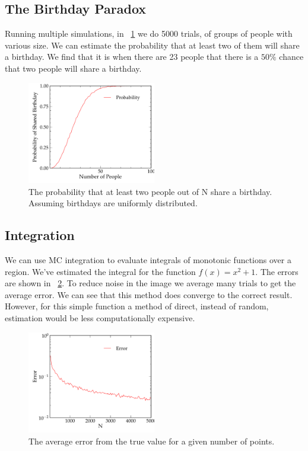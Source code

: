 \documentclass[11pt,letterpaper]{article}
\begin{document}
\subsection{The Birthday Paradox}

Running multiple simulations, in ~\ref{fig:birthday} we do 5000 trials,
 of groups of people with various size. We can estimate the probability that 
at least two of them will share a birthday. 
We find that it is when there are 23 people that there is a $50\%$ chance
that two people will share a birthday. 

\begin{figure}[bth]
\centering
\includegraphics[width=0.5\textwidth]{2a.pdf}
\caption{The probability that at least two people out of N share a birthday. 
Assuming birthdays are uniformly distributed.}
\label{fig:birthday}
\end{figure}

\subsection{Integration}

We can use MC integration to evaluate integrals of monotonic functions over a
region. We've estimated the integral for the function $f(x) = x^2 + 1$. The
errors are shown in ~\ref{fig:integrate}. To reduce noise in the image we 
average many trials to get the average error. We can see that this method does 
converge to the correct result. However, for this simple function a method of 
direct, instead of random, estimation would be less computationally expensive.

\begin{figure}[bth]
\centering
\includegraphics[width=0.5\textwidth]{3.pdf}
\caption{The average error from the true value for a given number of points.}
\label{fig:integrate}
\end{figure}
\end{document}
